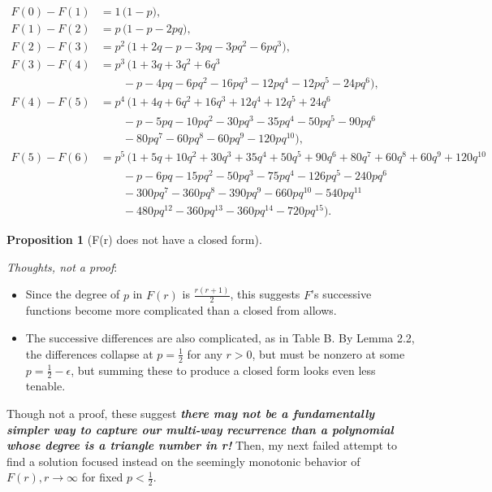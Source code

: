\documentclass[11pt, oneside]{article} 	%
\newtheorem{proposition}[theorem]{Proposition}
\begin{document}
\[
\begin{aligned}
F(0) - F(1) &= 1 \,\bigl( 1 - p\bigr), \\[6pt]
F(1) - F(2) &= p \,\bigl( 1 - p - 2pq \bigr), \\[6pt]
F(2) - F(3) &= p^{2}\,\bigl( 1 + 2q - p - 3pq - 3pq^{2} - 6pq^{3} \bigr), \\[6pt]
F(3) - F(4) &= p^{3}\,\bigl( 1 + 3q + 3q^{2} + 6q^{3} \\
&\qquad - p - 4pq - 6pq^{2} - 16pq^{3} - 12pq^{4} - 12pq^{5} - 24pq^{6} \bigr), \\[6pt]
F(4) - F(5) &= p^{4}\,\bigl( 1 + 4q + 6q^{2} + 16q^{3} + 12q^{4} + 12q^{5} + 24q^{6} \\
&\qquad - p - 5pq - 10pq^{2} - 30pq^{3} - 35pq^{4} - 50pq^{5} - 90pq^{6} \\
&\qquad - 80pq^{7} - 60pq^{8} - 60pq^{9} - 120pq^{10} \bigr), \\[6pt]
F(5) - F(6) &= p^{5}\,\bigl( 1 + 5q + 10q^{2} + 30q^{3} + 35q^{4} + 50q^{5} + 90q^{6} + 80q^{7} + 60q^{8} + 60q^{9} + 120q^{10} \\
&\qquad - p - 6pq - 15pq^{2} - 50pq^{3} - 75pq^{4} - 126pq^{5} - 240pq^{6} \\
&\qquad - 300pq^{7} - 360pq^{8} - 390pq^{9} - 660pq^{10} - 540pq^{11} \\
&\qquad - 480pq^{12} - 360pq^{13} - 360pq^{14} - 720pq^{15} \bigr).
\end{aligned}
\]


\begin{proposition}[F(r) does not have a closed form] 
\end{proposition}
\textit{Thoughts, not a proof}:
\begin{itemize}
\item Since the degree of $p$ in $F(r)$ is $\frac{r(r+1)}{2}$, this suggests $F$'s successive functions become more complicated than a closed from allows.
\item The successive differences are also complicated, as in Table B. By Lemma 2.2, the differences collapse at  $p = \frac1{2}$ for any $r > 0$, but must be nonzero at some $p=\frac1{2} - \epsilon$, but summing these to produce a closed form looks even less tenable.
\end{itemize}

Though not a proof, these suggest \textit{\textbf{there may not be a fundamentally simpler way to capture our multi-way recurrence than a polynomial whose degree is a triangle number in r!}} Then, my next failed attempt to find a solution focused instead on the seemingly monotonic behavior of $F(r), r \rightarrow \infty$ for fixed $p < \frac1{2}$.
\end{document}
